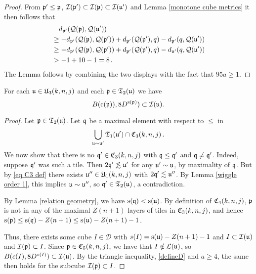 {\begin{proof}
    From $\mathfrak p' \le \mathfrak p$, $\mathcal{I}(\mathfrak p') \subset \mathcal{I}(\mathfrak p) \subset \mathcal{I}(\mathfrak u')$ and Lemma \ref{monotone cube metrics} it then follows that
    \begin{align*}
        &\quad d_{\mathfrak p'}(\mathcal{Q}(\mathfrak p), \mathcal{Q}(\mathfrak u'))\\
        &\ge -d_{\mathfrak p'}(\mathcal{Q}(\mathfrak p), \mathcal{Q}(\mathfrak p')) + d_{\mathfrak p'}(\mathcal{Q}(\mathfrak p'), q) - d_{\mathfrak p'}(q, \mathcal{Q}(\mathfrak u'))\\
        &\ge -d_{\mathfrak p'}(\mathcal{Q}(\mathfrak p), \mathcal{Q}(\mathfrak p')) + d_{\mathfrak p'}(\mathcal{Q}(\mathfrak p'), q) - d_{\mathfrak u'}(q, \mathcal{Q}(\mathfrak u'))\\
        &> -1 + 10 - 1 = 8\,.
    \end{align*}
    The Lemma follows by combining the two displays with the fact that $95 a \ge 1$.
\end{proof}

\begin{lemma}
    \label{forest inner}
    For each $\mathfrak u\in \mathfrak U_3(k,n,j)$
    and each $\mathfrak p \in \mathfrak{T}_2(\mathfrak u)$
    we have
    \begin{equation}
        B(\mathrm{c}(\mathfrak p)), 8 D^{\mathrm{s}(\mathfrak p)}) \subset \mathcal{I}(\mathfrak u).
    \end{equation}
\end{lemma}

\begin{proof}
    Let $\mathfrak p \in \mathfrak{T}_2(\mathfrak u)$. Let $\mathfrak q$ be a maximal element with respect to $\le$ in
    $$
        \bigcup_{\mathfrak u \sim \mathfrak u'} \mathfrak{T}_1(\mathfrak u') \cap \mathfrak C_3(k,n,j)\,.
    $$
    We now show that there is no $\mathfrak q' \in \mathfrak C_3(k,n,j)$ with $\mathfrak q \le \mathfrak q'$ and $\mathfrak q \ne \mathfrak q'$. Indeed, suppose $\mathfrak q'$ was such a tile. Then $2\mathfrak q' \not \lesssim \mathfrak u'$ for any $\mathfrak u' \sim \mathfrak u$, by maximality of $\mathfrak q$. But by \eqref{eq C3 def} there exists $\mathfrak u'' \in \mathfrak U_1(k,n,j)$ with $2\mathfrak q' \lesssim \mathfrak u''$. By Lemma \ref{wiggle order 1}, this implies $\mathfrak u \sim \mathfrak u''$, so $\mathfrak q' \in \mathfrak{T}_2(\mathfrak u)$, a contradiction.

    By Lemma \ref{relation geometry}, we have $\mathrm{s}(\mathfrak q) < \mathrm{s}(\mathfrak u)$. By definition of $\mathfrak C_4(k,n,j)$, $\mathfrak p$ is not in any of the maximal $Z(n+1)$ layers of tiles in $\mathfrak C_3(k,n,j)$, and hence $\mathrm{s}(\mathfrak p) \le \mathrm{s}(\mathfrak q) - Z(n+1) \le \mathrm{s}(\mathfrak u) - Z(n+1) - 1$.

    Thus, there exists some cube $I \in \mathcal{D}$ with $s(I) = \mathrm{s}(\mathfrak u) - Z(n+1) - 1$ and $I \subset \mathcal{I}(\mathfrak u)$ and $\mathcal{I}(\mathfrak p) \subset I$. Since $\mathfrak p \in \mathfrak C_5(k,n,j)$, we have that $I \notin \mathcal{L}(\mathfrak u)$, so $B(c(I), 8D^{s(I)}) \subset \mathcal{I}(\mathfrak u)$. By the triangle inequality, \eqref{defineD} and $a \ge 4$, the same then holds for the subcube $\mathcal{I}(\mathfrak p) \subset I$.
\end{proof}


}
